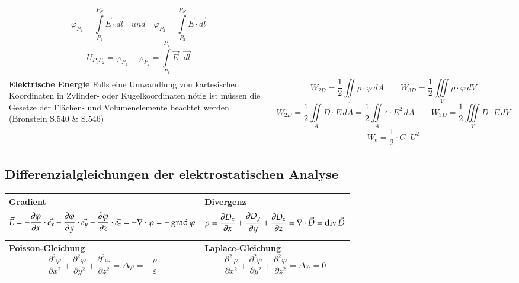 \begin{tabular}{|p{} |p{}|}
	\[\varphi_{P_1} = \int\limits_{P_1}^{P_N}\vec{E}\cdot\vec{dl}\quad und \quad \varphi_{P_2} = \int\limits_{P_2}^{P_N}\vec{E}\cdot\vec{dl}\] \[U_{P_1P_2} = \varphi_{P_1} - \varphi_{P_2} = \int\limits_{P_1}^{P_2}\vec{E}\cdot\vec{dl} \]\\
	\hline
	\textbf{Elektrische Energie}\newline
	Falls eine Umwandlung von kartesischen Koordinaten in Zylinder- oder Kugelkoordinaten nötig ist müssen die Gesetze der Flächen- und Volumenelemente beachtet werden (Bronstein S.540 \& S.546)
	&\[W_{2D}=\frac{1}{2} \iint\limits_{A} \rho \cdot \varphi \, dA \quad \quad W_{3D}=\frac{1}{2} \iiint\limits_{V} \rho \cdot \varphi \, dV \]
	\[W_{2D} = \frac{1}{2} \iint\limits_{A} D \cdot  E \, dA = \frac{1}{2} \iint\limits_{A}\varepsilon\cdot E^2 \, dA\quad \quad
	W_{3D}=\frac{1}{2} \iiint\limits_{V} D \cdot E \, dV
	\]
	\[W_e = \frac{1}{2}\cdot C\cdot U^2\]\\
	\hline
\end{tabular}
\clearpage
\pagebreak
\subsection{Differenzialgleichungen der elektrostatischen Analyse}
\begin{tabular}{|p{} |p{}|}
	\hline
	\textbf{Gradient}\newline
	\[ \vec{E}= - \dfrac{\partial\varphi}{\partial x} \cdot \vec{e_{x}} -  \dfrac{\partial\varphi}{\partial y} \cdot \vec{e_{y}}- \dfrac{\partial\varphi}{\partial z} \cdot \vec{e_{z}} = -\nabla \cdot \varphi = -\operatorname{grad} \varphi\]&
	\textbf{Divergenz}\newline
	\[ \rho= \dfrac{\partial D_{x}}{\partial x} +  \dfrac{\partial D_{y}}{\partial y} + \dfrac{\partial D_{z}}{\partial z}= \nabla \cdot \vec{D}= \operatorname{div} \vec{D} \]\\
	\hline
	\textbf{Poisson-Gleichung}\newline
	\[ \dfrac{\partial^2\varphi}{\partial x^2} +  \dfrac{\partial^2\varphi}{\partial y^2} + \dfrac{\partial^2\varphi}{\partial z^2} =\Delta \varphi = -\dfrac{\rho}{\varepsilon} \]&
	\textbf{Laplace-Gleichung}  \[ \dfrac{\partial^2\varphi}{\partial x^2} +  \dfrac{\partial^2\varphi}{\partial y^2} + \dfrac{\partial^2\varphi}{\partial z^2} =\Delta \varphi = 0 \]\\
	\hline
\end{tabular}
